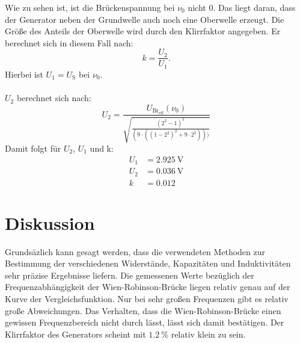 \documentclass[
  bibliography=totoc,     %
  captions=tableheading,  %
  titlepage=firstiscover, %
]{scrartcl}
\begin{document}
\clearpage
Wie zu sehen ist, ist die Brückenspannung bei $\nu_0$ nicht 0. Das liegt daran, dass
der Generator neben der Grundwelle auch noch eine Oberwelle erzeugt. Die Größe des
Anteils der Oberwelle wird durch den Klirrfaktor angegeben.
Er berechnet sich in diesem Fall nach:
\begin{equation}
  k = \frac{U_2}{U_1}.
  \label{eqn:klirr}
\end{equation}
Hierbei ist $U_1 = U_\mathup{S}$ bei $\nu_0$.
\\
\\
$U_2$ berechnet sich nach:
\begin{equation}
  U_2 = \frac{U_\mathup{Br_{eff}}\left( \nu_0 \right)}{\sqrt{\frac{(2^2-1)^2}{(9\cdot((1-2^2)^2+9\cdot2^2)))}}}
  \label{eqn:u2}
\end{equation}
Damit folgt für $U_2$, $U_1$ und k:
\begin{align}
  U_1 &= \SI{2.925}{\volt}\\
  U_2 &= \SI{0.036}{\volt}\\
  k &= \num{0.012}
\end{align}

\section{Diskussion}
\label{sec:diskussion}
Grundsäzlich kann gesagt werden, dass die verwendeten Methoden zur Bestimmung der
verschiedenen Widerstände, Kapazitäten und Induktivitäten sehr präzise Ergebnisse liefern.
Die gemessenen Werte bezüglich der Frequenzabhängigkeit der Wien-Robinson-Brücke
liegen relativ genau auf der Kurve der Vergleichsfunktion. Nur bei sehr großen Frequenzen
gibt es relativ große Abweichungen. Das Verhalten, dass die Wien-Robinson-Brücke
einen gewissen Frequenzbereich nicht durch lässt, lässt sich damit bestätigen.
Der Klirrfaktor des Generators scheint mit $\SI{1.2}{\percent}$ relativ klein zu sein.\\
\nocite{*}
\printbibliography
\end{document}
